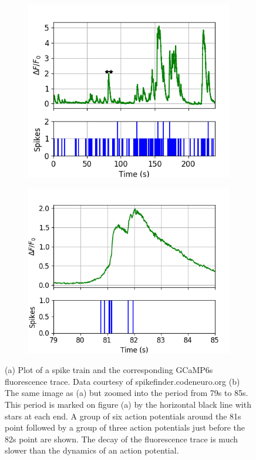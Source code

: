 \documentclass[a4paper,12pt]{article}
\theoremstyle{definition}
\begin{document}
\begin{figure}[p]
  \begin{subfigure}{0.5\textwidth}
    \centering
    \includegraphics[width=\textwidth]{figures/spike_finder_example_8.png}
    \caption{}
  \end{subfigure}
  \begin{subfigure}{0.5\textwidth}
    \centering
    \includegraphics[width=\textwidth]{figures/spike_finder_example_8_zoomed.png}
    \caption{}
  \end{subfigure}
  \caption{(a) Plot of a spike train and the corresponding GCaMP6s fluorescence trace. Data courtesy of spikefinder.codeneuro.org (b) The same image as (a) but zoomed into the period from 79s to 85s. This period is marked on figure (a) by the horizontal black line with stars at each end. A group of six action potentials around the 81s point followed by a group of three action potentials just before the 82s point are shown. The decay of the fluorescence trace is much slower than the dynamics of an action potential.}
  \label{fig:spike_finder_example}
\end{figure}
\end{document}
